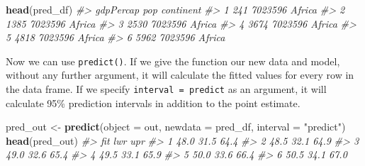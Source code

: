\documentclass[]{book}
\newenvironment{Shaded}{\begin{snugshade}}{\end{snugshade}}
\newcommand{\CommentTok}[1]{\textcolor[rgb]{0.56,0.35,0.01}{\textit{#1}}}
\newcommand{\DataTypeTok}[1]{\textcolor[rgb]{0.13,0.29,0.53}{#1}}
\newcommand{\DecValTok}[1]{\textcolor[rgb]{0.00,0.00,0.81}{#1}}
\newcommand{\KeywordTok}[1]{\textcolor[rgb]{0.13,0.29,0.53}{\textbf{#1}}}
\newcommand{\NormalTok}[1]{#1}
\newcommand{\OperatorTok}[1]{\textcolor[rgb]{0.81,0.36,0.00}{\textbf{#1}}}
\newcommand{\StringTok}[1]{\textcolor[rgb]{0.31,0.60,0.02}{#1}}
\begin{document}
\begin{Shaded}
\end{Shaded}

\begin{Shaded}
\begin{Highlighting}[]
\KeywordTok{head}\NormalTok{(pred_df)}
\CommentTok{#>   gdpPercap     pop continent}
\CommentTok{#> 1       241 7023596    Africa}
\CommentTok{#> 2      1385 7023596    Africa}
\CommentTok{#> 3      2530 7023596    Africa}
\CommentTok{#> 4      3674 7023596    Africa}
\CommentTok{#> 5      4818 7023596    Africa}
\CommentTok{#> 6      5962 7023596    Africa}
\end{Highlighting}
\end{Shaded}

Now we can use \texttt{predict()}. If we give the function our new data and model, without any further argument, it will calculate the fitted values for every row in the data frame. If we specify \texttt{interval\ =\ \textquotesingle{}predict\textquotesingle{}} as an argument, it will calculate 95\% prediction intervals in addition to the point estimate.

\begin{Shaded}
\begin{Highlighting}[]
\NormalTok{pred_out <-}\StringTok{ }\KeywordTok{predict}\NormalTok{(}\DataTypeTok{object =}\NormalTok{ out,}
                    \DataTypeTok{newdata =}\NormalTok{ pred_df,}
                    \DataTypeTok{interval =} \StringTok{"predict"}\NormalTok{)}
\KeywordTok{head}\NormalTok{(pred_out)}
\CommentTok{#>    fit  lwr  upr}
\CommentTok{#> 1 48.0 31.5 64.4}
\CommentTok{#> 2 48.5 32.1 64.9}
\CommentTok{#> 3 49.0 32.6 65.4}
\CommentTok{#> 4 49.5 33.1 65.9}
\CommentTok{#> 5 50.0 33.6 66.4}
\CommentTok{#> 6 50.5 34.1 67.0}
\end{Highlighting}
\end{Shaded}
\end{document}
